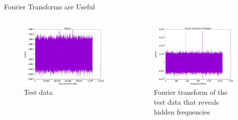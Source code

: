 \documentclass[10pt, aspectratio=168]{beamer}
\begin{document}
    \begin{frame}{Fourier Transforms are Useful}
    \begin{columns}
        \begin{column}{0.4\textwidth}    
            \begin{figure}[h]
                \centering
                \includegraphics[width=1\textwidth]{test_08.png}
                \caption{Test data}
                \label{fig:test-08}
            \end{figure}
        \end{column}
        \begin{column}{0.4\textwidth}    
            \begin{figure}[h]
                \centering
                \includegraphics[width=1\textwidth]{fft_test_08.png}
                \caption{Fourier transform of the test data that reveals hidden frequencies}
                \label{fig:fft-test-08}
            \end{figure}
        \end{column}
    \end{columns} 
    \end{frame}
    
\end{document}
